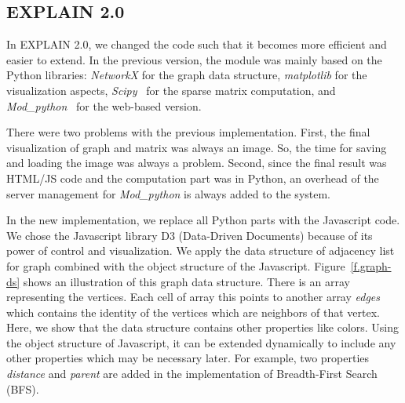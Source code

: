 \documentclass[12pt, twoside,a4paper,toc=bibliography]{scrbook}
\begin{document}
\subsection{EXPLAIN 2.0}
\label{s.impl.explain2}
In EXPLAIN 2.0, we changed the code such that it becomes more efficient and easier to extend.
In the previous version, the module was mainly based on the Python libraries:
\textit{NetworkX} \cite{networkx2008} for the graph data structure,
\textit{matplotlib} \cite{matplotlib2007} for the visualization aspects,
\textit{Scipy}~\cite{scipy2001} for the sparse matrix computation, and
\textit{Mod\_python}~\cite{modpython2013} for the web-based version.

There were two problems with the previous implementation. First, the final visualization
of graph and matrix was always an image.
So, the time for saving and loading the image was always a problem.
Second, since the final result was HTML/JS code and the computation part was in Python,
an overhead of the server management for \textit{Mod\_python} is always added to the system.

In the new implementation, we replace all Python parts with the Javascript code.
We chose the Javascript library D3 (Data-Driven Documents)
because of its power of control and visualization.
We apply the data structure of adjacency list for graph
combined with the object structure of the Javascript. 
Figure~\ref{f.graph-ds} shows an illustration
of this graph data structure. There is an array representing the vertices.
Each cell of array this points to another array \textit{edges} which contains
the identity of the vertices which are neighbors of that vertex.
Here, we show that the data structure contains other properties like colors.
Using the object structure of Javascript,
it can be extended dynamically to include any other properties which may be necessary later. For example, two properties \textit{distance} and \textit{parent} are added
in the implementation of Breadth-First Search (BFS).
\end{document}
